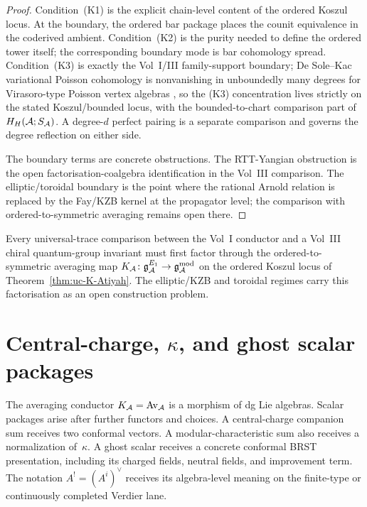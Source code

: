 \begin{proof}
Condition~(K1) is the explicit chain-level content of the ordered
Koszul locus.  At the boundary, the ordered bar package places the
counit equivalence in the coderived ambient. Condition~(K2) is the
purity needed to define the ordered tower itself; the corresponding
boundary mode is bar cohomology spread.
Condition~(K3) is exactly the Vol~I/III family-support boundary;
De Sole--Kac variational Poisson cohomology is nonvanishing in
unboundedly many degrees for Virasoro-type Poisson vertex algebras
\cite{BDSK21}, so the (K3) concentration lives strictly on the stated
Koszul/bounded locus, with the bounded-to-chart comparison part of
$H_H(\mathcal{A};S_{\mathcal{A}})$.  A
degree-$d$ perfect pairing is a separate comparison and governs the
degree reflection on either side.

The boundary terms are concrete obstructions. The RTT-Yangian
obstruction is the open factorisation-coalgebra identification in
the Vol~III comparison.
The elliptic/toroidal boundary is the point where the rational Arnold
relation is replaced by the Fay/KZB kernel at the propagator level; the
comparison with ordered-to-symmetric averaging remains open there.
\end{proof}

\begin{conjecture}
\label{thm:uc-universal-trace-identity}
\ClaimStatusConjectured
Every universal-trace comparison between the Vol~I conductor and a
Vol~III chiral quantum-group invariant must first factor through the
ordered-to-symmetric averaging map
$K_{\mathcal{A}}\colon \mathfrak{g}_{\mathcal{A}}^{E_1}\to \mathfrak{g}_{\mathcal{A}}^{\mathrm{mod}}$ on the ordered Koszul locus of
Theorem~\ref{thm:uc-K-Atiyah}. The elliptic/KZB and toroidal regimes
carry this factorisation as an open construction problem.
\end{conjecture}

\section{Central-charge, \texorpdfstring{$\kappa$}{kappa}, and ghost scalar packages}
\label{sec:uc-scalar-packages}

The averaging conductor $K_{\mathcal{A}}=\operatorname{Av}_{\mathcal{A}}$ is a morphism of dg Lie
algebras.  Scalar packages arise after further functors and choices.
A central-charge companion sum receives two conformal vectors.  A
modular-characteristic sum also receives a normalization of~$\kappa$.
A ghost scalar receives a concrete conformal BRST presentation,
including its charged fields, neutral fields, and improvement term.
The notation $A^!=(A^i)^\vee$ receives its algebra-level meaning on the
finite-type or continuously completed Verdier lane.

